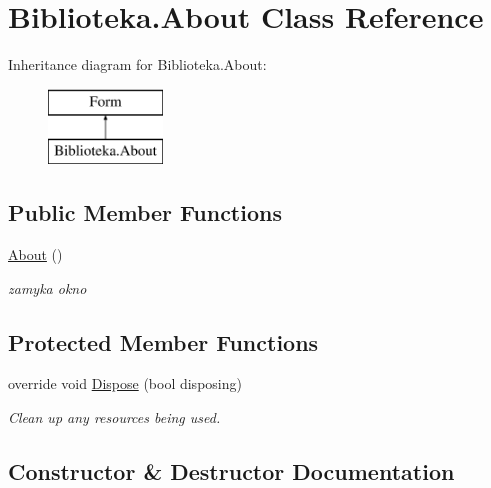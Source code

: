\hypertarget{class_biblioteka_1_1_about}{}\section{Biblioteka.\+About Class Reference}
\label{class_biblioteka_1_1_about}
Inheritance diagram for Biblioteka.\+About\+:\begin{figure}[H]
\begin{center}
\leavevmode
\includegraphics[height=2.000000cm]{class_biblioteka_1_1_about}
\end{center}
\end{figure}
\subsection*{Public Member Functions}
\begin{DoxyCompactItemize}
\item 
\hyperlink{class_biblioteka_1_1_about_a2e51d5094f680831101cc19a52f14c77}{About} ()
\begin{DoxyCompactList}\small\item\em zamyka okno \end{DoxyCompactList}\end{DoxyCompactItemize}
\subsection*{Protected Member Functions}
\begin{DoxyCompactItemize}
\item 
override void \hyperlink{class_biblioteka_1_1_about_ae46b736c38521c1c20e00fad6979cdf9}{Dispose} (bool disposing)
\begin{DoxyCompactList}\small\item\em Clean up any resources being used. \end{DoxyCompactList}\end{DoxyCompactItemize}


\subsection{Constructor \& Destructor Documentation}
\mbox{\label{class_biblioteka_1_1_about_a2e51d5094f680831101cc19a52f14c77}} 
